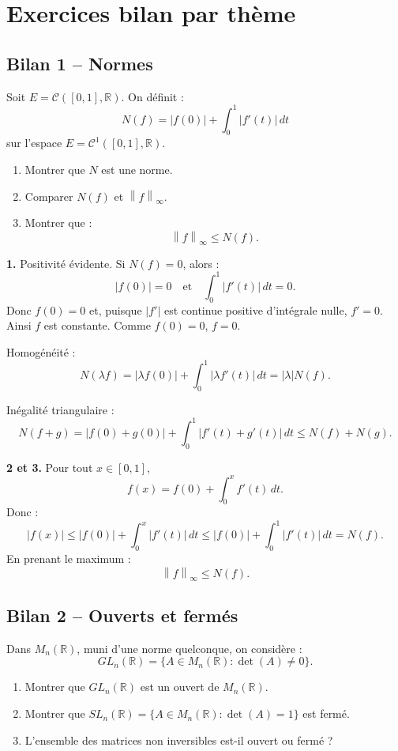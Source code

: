\documentclass[11pt,a4paper]{article}
\newcommand{\R}{\mathbb R}
\newcommand{\norme}[1]{\left\lVert #1 \right\rVert}
\begin{document}
\section{Exercices bilan par thème}

\subsection*{Bilan 1 -- Normes}

\begin{exercicebox}[Bilan 1]
Soit \(E=\mathcal C([0,1],\R)\).  
On définit :
\[
N(f)=|f(0)|+\int_0^1 |f'(t)|\,dt
\]
sur l'espace \(E=\mathcal C^1([0,1],\R)\).

\begin{enumerate}
    \item Montrer que \(N\) est une norme.
    \item Comparer \(N(f)\) et \(\norme{f}_\infty\).
    \item Montrer que :
    \[
    \norme{f}_\infty\leq N(f).
    \]
\end{enumerate}
\end{exercicebox}

\begin{correctionbox}[Bilan 1]
\textbf{1.}  
Positivité évidente.  
Si \(N(f)=0\), alors :
\[
|f(0)|=0
\quad\text{et}\quad
\int_0^1 |f'(t)|\,dt=0.
\]
Donc \(f(0)=0\) et, puisque \(|f'|\) est continue positive d'intégrale nulle, \(f'=0\).  
Ainsi \(f\) est constante. Comme \(f(0)=0\), \(f=0\).

Homogénéité :
\[
N(\lambda f)=|\lambda f(0)|+\int_0^1 |\lambda f'(t)|\,dt
=|\lambda|N(f).
\]

Inégalité triangulaire :
\[
N(f+g)
=|f(0)+g(0)|+\int_0^1 |f'(t)+g'(t)|\,dt
\leq N(f)+N(g).
\]

\textbf{2 et 3.}  
Pour tout \(x\in[0,1]\),
\[
f(x)=f(0)+\int_0^x f'(t)\,dt.
\]
Donc :
\[
|f(x)|\leq |f(0)|+\int_0^x |f'(t)|\,dt
\leq |f(0)|+\int_0^1 |f'(t)|\,dt
=N(f).
\]
En prenant le maximum :
\[
\norme{f}_\infty\leq N(f).
\]
\end{correctionbox}

\subsection*{Bilan 2 -- Ouverts et fermés}

\begin{exercicebox}[Bilan 2]
Dans \(M_n(\R)\), muni d'une norme quelconque, on considère :
\[
GL_n(\R)=\{A\in M_n(\R):\det(A)\neq0\}.
\]

\begin{enumerate}
    \item Montrer que \(GL_n(\R)\) est un ouvert de \(M_n(\R)\).
    \item Montrer que \(SL_n(\R)=\{A\in M_n(\R):\det(A)=1\}\) est fermé.
    \item L'ensemble des matrices non inversibles est-il ouvert ou fermé ?
\end{enumerate}
\end{exercicebox}
\end{document}

